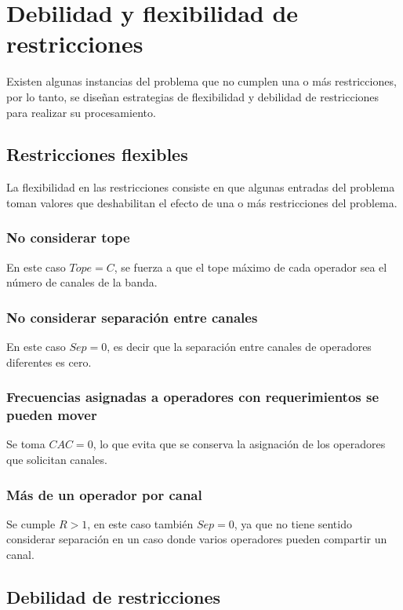 \section{Debilidad y flexibilidad de restricciones}

Existen algunas instancias del problema que no cumplen una o más restricciones, por lo tanto, se diseñan estrategias de flexibilidad y debilidad de restricciones para realizar su procesamiento.

\subsection{Restricciones flexibles}

La flexibilidad en las restricciones consiste en que algunas entradas del problema toman valores que deshabilitan el efecto de una o más restricciones del problema.

\subsubsection{No considerar tope}

En este caso $Tope=C$, se fuerza a que el tope máximo de cada operador sea el número de canales de la banda.

\subsubsection{No considerar separación entre canales}

En este caso $Sep=0$, es decir que la separación entre canales de operadores diferentes es cero.

\subsubsection{Frecuencias asignadas a operadores con requerimientos se pueden mover}

Se toma $CAC = 0$, lo que evita que se conserva la asignación de los operadores que solicitan canales.

\subsubsection{Más de un operador por canal}

Se cumple $R>1$, en este caso también $Sep=0$, ya que no tiene sentido considerar separación en un caso donde varios operadores pueden compartir un canal.

\subsection{Debilidad de restricciones}

